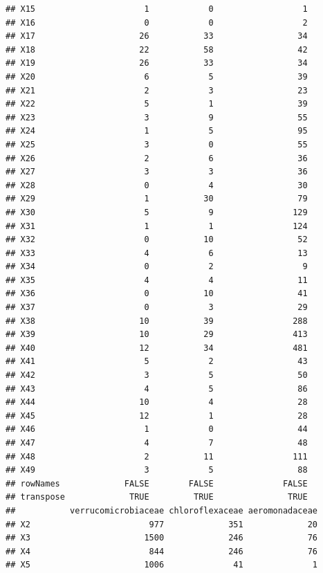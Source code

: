 \documentclass[10pt,handout,english]{beamer}\usepackage[]{graphicx}\usepackage[]{color}
\makeatletter
\newenvironment{kframe}{%
 \def\at@end@of@kframe{}%
 \ifinner\ifhmode%
  \def\at@end@of@kframe{\end{minipage}}%
  \begin{minipage}{\columnwidth}%
 \fi\fi%
 \def\FrameCommand##1{\hskip\@totalleftmargin \hskip-\fboxsep
 \colorbox{shadecolor}{##1}\hskip-\fboxsep
     \hskip-\linewidth \hskip-\@totalleftmargin \hskip\columnwidth}%
 \MakeFramed {\advance\hsize-\width
   \@totalleftmargin\z@ \linewidth\hsize
   \@setminipage}}%
 {\par\unskip\endMakeFramed%
 \at@end@of@kframe}
\newenvironment{knitrout}{}{} %
\makeatother
\begin{document}
\begin{frame}[fragile]
\begin{knitrout}
\begin{kframe}
\begin{verbatim}
## X15                      1            0                  1
## X16                      0            0                  2
## X17                     26           33                 34
## X18                     22           58                 42
## X19                     26           33                 34
## X20                      6            5                 39
## X21                      2            3                 23
## X22                      5            1                 39
## X23                      3            9                 55
## X24                      1            5                 95
## X25                      3            0                 55
## X26                      2            6                 36
## X27                      3            3                 36
## X28                      0            4                 30
## X29                      1           30                 79
## X30                      5            9                129
## X31                      1            1                124
## X32                      0           10                 52
## X33                      4            6                 13
## X34                      0            2                  9
## X35                      4            4                 11
## X36                      0           10                 41
## X37                      0            3                 29
## X38                     10           39                288
## X39                     10           29                413
## X40                     12           34                481
## X41                      5            2                 43
## X42                      3            5                 50
## X43                      4            5                 86
## X44                     10            4                 28
## X45                     12            1                 28
## X46                      1            0                 44
## X47                      4            7                 48
## X48                      2           11                111
## X49                      3            5                 88
## rowNames             FALSE        FALSE              FALSE
## transpose             TRUE         TRUE               TRUE
##           verrucomicrobiaceae chloroflexaceae aeromonadaceae
## X2                        977             351             20
## X3                       1500             246             76
## X4                        844             246             76
## X5                       1006              41              1

\end{verbatim}
\end{kframe}
\end{knitrout}
\end{frame}
\end{document}
